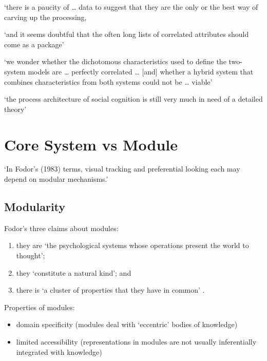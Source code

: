 \documentclass[12pt]{extarticle}
\begin{document}
\begin{multicols}{3}
‘there is a paucity of … data to suggest that they are the only or the best way of carving up the processing,

‘and it seems doubtful that the often long lists of correlated attributes should come as a package’
\citep[p.\ 759]{adolphs_conceptual_2010}

‘we wonder whether the dichotomous characteristics used to define the two-system
models are … perfectly correlated …
[and] whether a hybrid system that combines characteristics from both
systems could not be … viable’
\citep[p.\ 537]{keren_two_2009}

‘the process architecture of social cognition is still very much in need of a detailed theory’
\citep[p.\ 759]{adolphs_conceptual_2010}



\section{Core System vs Module}

‘In Fodor’s (1983) terms, visual tracking and preferential looking each may depend on modular mechanisms.’
\citep[p.\ 137]{spelke:1995_spatiotemporal}

\subsection{Modularity}

Fodor’s three claims about modules:

\begin{enumerate}

\item they are ‘the psychological systems whose operations present the world to thought’;

\item they ‘constitute a natural kind’; and

\item there is ‘a cluster of properties that they have in common’ \citep[p.\ 101]{Fodor:1983dg}.

\end{enumerate}

Properties of modules:

\begin{itemize}

\item domain specificity (modules deal with ‘eccentric’ bodies of knowledge)

\item limited accessibility (representations in modules are not usually inferentially integrated with knowledge)


\end{itemize}
\end{multicols}
\end{document}
